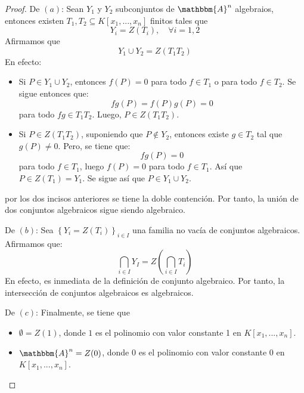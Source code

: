 \documentclass[12pt]{report}
\newcounter{it}
\theoremstyle{largebreak}
\newcommand{\bbm}[1]{\ensuremath{\mathbbm{#1}}}
\begin{document}
    \begin{proof}
        De $(a)$: Sean $Y_1$ y $Y_2$ subconjuntos de $\bbm{A}^n$ algebraios, entonces existen $T_1,T_2\subseteq K[x_1,...,x_n]$ finitos tales que
        \begin{equation*}
            Y_i=Z(T_i),\quad\forall i=1,2
        \end{equation*}
        Afirmamos que
        \begin{equation*}
            Y_1\cup Y_2=Z(T_1T_2)
        \end{equation*}
        En efecto:
        \begin{itemize}
            \item Si $P\in Y_1\cup Y_2$, entonces $f(P)=0$ para todo $f\in T_1$ o para todo $f\in T_2$. Se sigue entonces que:
            \begin{equation*}
                fg(P)=f(P)g(P)=0
            \end{equation*}
            para todo $fg\in T_1T_2$. Luego, $P\in Z(T_1T_2)$.
            \item Si $P\in Z(T_1T_2)$, suponiendo que $P\notin Y_2$, entonces existe $g\in T_2$ tal que $g(P)\neq 0$. Pero, se tiene que:
            \begin{equation*}
                fg(P)=0
            \end{equation*}
            para todo $f\in T_1$, luego $f(P)=0$ para todo $f\in T_1$. Así que $P\in Z(T_1)=Y_1$. Se sigue así que $P\in Y_1\cup Y_2$.
        \end{itemize}
        por los dos incisos anteriores se tiene la doble contención. Por tanto, la unión de dos conjuntos algebraicos sigue siendo algebraico.

        De $(b)$: Sea $\left\{Y_i=Z(T_i) \right\}_{ i\in I}$ una familia no vacía de conjuntos algebraicos. Afirmamos que:
        \begin{equation*}
            \bigcap_{ i\in I}Y_I=Z\left(\bigcap_{ i\in I}T_i \right)
        \end{equation*}
        En efecto, es inmediata de la definición de conjunto algebraico. Por tanto, la intersección de conjuntos algebraicos es algebraicos.

        De $(c)$: Finalmente, se tiene que
        \begin{itemize}
            \item $\emptyset=Z(1)$, donde $1$ es el polinomio con valor constante 1 en $K[x_1,...,x_n]$.
            \item $\bbm{A}^n=Z(0)$, donde 0 es el polinomio con valor constante 0 en $K[x_1,...,x_n]$.
        \end{itemize}
    \end{proof}
    
\end{document}
